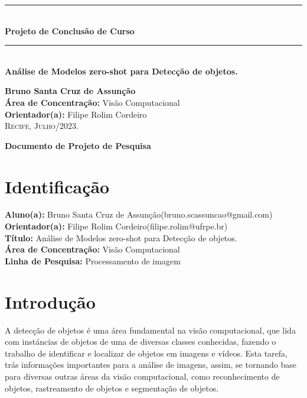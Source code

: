\documentclass[openany, a4paper,12pt, oneside]{article}
\makeatletter
\def\myname{Bruno Santa Cruz de Assun\c{c}\~{a}o}
\def\myemail{bruno.scassuncao@gmail.com}
\def\mytitle{An\'{a}lise de Modelos zero-shot para Detec\c{c}\~{a}o de objetos.}
\def\myadvisor{Filipe Rolim Cordeiro}
\def\myadvisoremail{filipe.rolim@ufrpe.br}
\def\concentrationarea{Visão Computacional}
\def\researchline{Processamento de imagem}
\makeatother
\begin{document}
\pagestyle{empty}
\begin{flushright}
  \noindent\rule{15cm}{0.4pt}\\[0.5cm]
  \textbf{{ \LARGE Projeto de Conclus\~{a}o de Curso}}\\[0.1cm]
  \noindent\rule{15cm}{0.4pt}\\[7cm]
  \textbf{\Large \mytitle}\\[4cm]
\end{flushright}

\begin{center}
  \textbf{\large \myname }\\[3cm]

  \textbf{\large \'{A}rea de Concentra\c{c}\~{a}o:} \concentrationarea\\
  \textbf{\large Orientador(a):} \myadvisor\\[2cm]
  \vfill
  \textsc{Recife, Julho/2023}.
\end{center}
\pagebreak
{}

\begin{center}
  \textbf{\large Documento de Projeto de Pesquisa}\\[1cm]
\end{center}
\section{Identifica\c{c}\~{a}o}

\textbf{Aluno(a):} \myname (\myemail)\\
\textbf{Orientador(a):} \myadvisor (\myadvisoremail)\\
\textbf{T\'{i}tulo:} \mytitle\\
\textbf{\'{A}rea de Concentra\c{c}\~{a}o:} \concentrationarea\\
\textbf{Linha de Pesquisa:} \researchline\\


\section{Introdu\c{c}\~{a}o}


A detec\c{c}\~{a}o de objetos é uma área fundamental na visão computacional, que lida com inst\'{a}ncias de objetos de uma de diversas classes conhecidas, fazendo o trabalho de  identificar e localizar de objetos em imagens e vídeos\cite{Amit2021}. Esta tarefa, tr\'{a}s informa\c{c}\~{o}es importantes para a an\'{a}lise de imagens, assim, se tornando base para diversas outras \'{a}reas da vis\~{a}o computacional, como reconhecimento de objetos, rastreamento de objetos e segmenta\c{c}\~{a}o de objetos\cite{10028728}.
\end{document}
